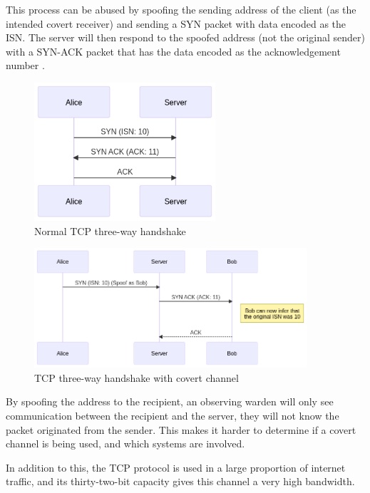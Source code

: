 This process can be abused by spoofing the sending address of the client (as the intended covert receiver) and sending a SYN packet with data encoded as the ISN. The server will then respond to the spoofed address (not the original sender) with a SYN-ACK packet that has the data encoded as the acknowledgement number \citep{CCitTCPIPPS}.

\begin{figure}[!h]
    \centering
    \includegraphics[width=0.6\textwidth]{fig/TCPACKNormal.png}
    \caption{Normal TCP three-way handshake}
    \label{fig:TCPACKNormal}
\end{figure}

\begin{figure}[!h]
    \centering
    \includegraphics[width=0.9\textwidth]{fig/TCPACKCC.png}
    \caption{TCP three-way handshake with covert channel}
    \label{fig:TCPACKCC}
\end{figure}


By spoofing the address to the recipient, an observing warden will only see communication between the recipient and the server, they will not know the packet originated from the sender. This makes it harder to determine if a covert channel is being used, and which systems are involved.

In addition to this, the TCP protocol is used in a large proportion of internet traffic, and its thirty-two-bit capacity gives this channel a very high bandwidth.

